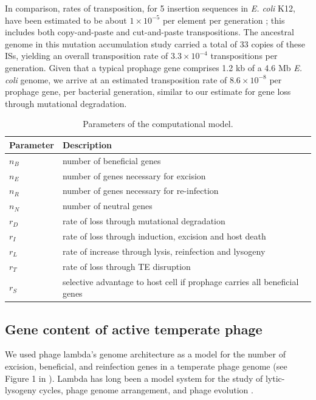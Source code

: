 In comparison, rates of transposition, for 5 insertion sequences in {\it E. coli} K12, have been estimated to be about $1\times10^{-5}$ per element per generation \cite{sousa_rates_2013}; this includes both copy-and-paste and cut-and-paste transpositions.  The ancestral genome in this mutation accumulation study carried a total of 33 copies of these ISs, yielding an overall transposition rate of $3.3\times10^{-4}$ transpositions per generation.  Given that a typical prophage gene comprises 1.2 kb \cite{khan_quantifying_2019} of a 4.6 Mb {\it E. coli} genome, we arrive at an estimated transposition rate of $8.6\times10^{-8}$ per prophage gene, per bacterial generation, similar to our estimate for gene loss through mutational degradation.

\begin{table}
\begin{tabular}{ p{2.5cm}p{11.5cm} }
\hline
Parameter   &  Description  \\
\hline
$n_B$ & number of beneficial genes\\
$n_E$ & number of genes necessary for excision\\
$n_R$ & number of genes necessary for re-infection\\
$n_N$ & number of neutral genes\\
$r_{D}$ & rate of loss through mutational degradation \\
$r_{I}$ & rate of loss through induction, excision and host death \\
$r_{L}$ & rate of increase through lysis, reinfection and lysogeny\\
$r_{T}$ & rate of loss through TE disruption\\
$r_S$ & selective advantage to host cell if prophage carries all beneficial genes  \\
\hline
\end{tabular}
\caption{Parameters of the computational model.}
\label{tab:params}
\end{table}

\subsection{Gene content of active temperate phage}

We used phage lambda's genome architecture as a model for the number of excision, beneficial, and reinfection genes in a temperate phage genome (see Figure 1 in \cite{rajagopala_protein_2011}). Lambda has long been a model system for the study of lytic-lysogeny cycles, phage genome arrangement, and phage evolution \cite{calendar_bacteriophages_2006}.

